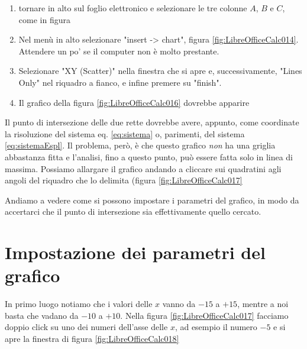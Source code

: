 \documentclass[17pt]{extarticle}
\begin{document}
\begin{enumerate}
	\item tornare in alto sul foglio elettronico e selezionare le tre colonne $A$, $B$ e $C$, come in figura 
	
	
	
	\item Nel menù in alto selezionare "insert -> chart", figura \ref{fig:LibreOfficeCalc014}. Attendere un po' se il computer non è molto prestante.
	
	
	\item Selezionare "XY (Scatter)" nella finestra che si apre e, successivamente, "Lines Only" nel riquadro a fianco, e infine premere su "finish".
	
	

	
	\item Il grafico della figura \ref{fig:LibreOfficeCalc016} dovrebbe apparire

	
\end{enumerate}
Il punto di intersezione delle due rette dovrebbe avere, appunto, come coordinate la risoluzione del sistema eq. \ref{eq:sistema} o, parimenti, del sistema \ref{eq:sistemaEspl}. Il problema, però, è che questo grafico \emph{non} ha una griglia abbastanza fitta e l'analisi, fino a questo punto, può essere fatta solo in linea di massima. Possiamo allargare il grafico andando a cliccare sui quadratini agli angoli del riquadro che lo delimita (figura \ref{fig:LibreOfficeCalc017}




Andiamo a vedere come si possono impostare i parametri del grafico, in modo da accertarci che il punto di intersezione sia effettivamente quello cercato.

\newpage

\section{Impostazione dei parametri del grafico}

In primo luogo notiamo che i valori delle $x$ vanno da $-15$ a $+15$, mentre a noi basta che vadano da $-10$ a $+10$. Nella figura \ref{fig:LibreOfficeCalc017} facciamo doppio click su uno dei numeri dell'asse delle $x$, ad esempio il numero $-5$ e si apre la finestra di figura \ref{fig:LibreOfficeCalc018}
\end{document}
